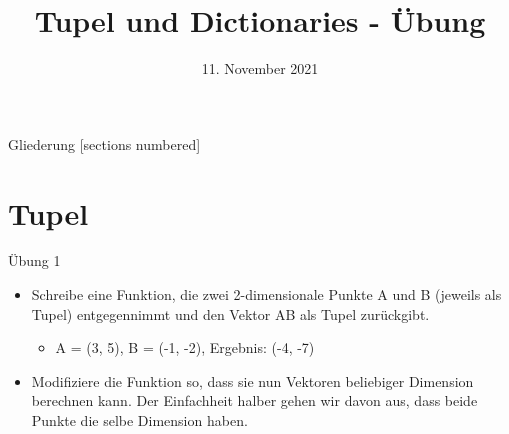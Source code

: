 



\title{Tupel und Dictionaries - Übung}
\date{11. November 2021}


\maketitle

\begin{frame}{Gliederung}
	[sections numbered]
	\tableofcontents
\end{frame}


\section{Tupel}

\begin{frame}{Übung 1}
	\begin{itemize}
		\item[\textbf{1.}] Schreibe eine Funktion, die zwei 2-dimensionale Punkte A und B (jeweils als Tupel) entgegennimmt und den Vektor AB als Tupel zurückgibt.
		\begin{itemize}
			\item[\textbf{Bsp.:}] A = (3, 5), B = (-1, -2), Ergebnis: (-4, -7)
		\end{itemize}
		\item[\textbf{2.}] Modifiziere die Funktion so, dass sie nun Vektoren beliebiger Dimension berechnen kann. Der Einfachheit halber gehen wir davon aus, dass beide Punkte die selbe Dimension haben.
	\end{itemize}
\end{frame}


